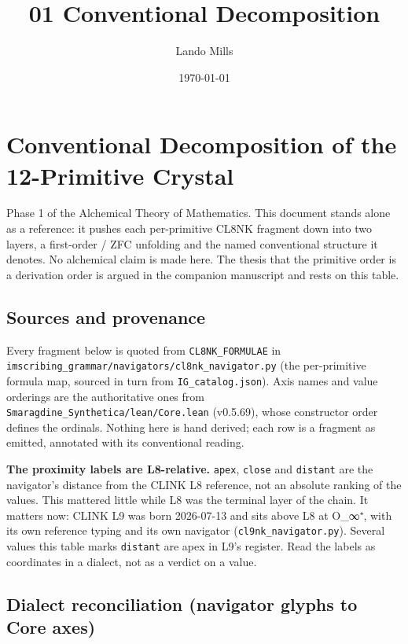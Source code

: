 \documentclass[12pt,a4paper]{article}
\title{01 Conventional Decomposition}
\date{\today}
\author{Lando Mills}
\begin{document}
\maketitle
\hypertarget{conventional-decomposition-of-the-12-primitive-crystal}{%
\section{Conventional Decomposition of the 12-Primitive
Crystal}\label{conventional-decomposition-of-the-12-primitive-crystal}}

Phase 1 of the Alchemical Theory of Mathematics. This document stands
alone as a reference: it pushes each per-primitive CL8NK fragment down
into two layers, a first-order / ZFC unfolding and the named
conventional structure it denotes. No alchemical claim is made here. The
thesis that the primitive order is a derivation order is argued in the
companion manuscript and rests on this table.

\hypertarget{sources-and-provenance}{%
\subsection{Sources and provenance}\label{sources-and-provenance}}

Every fragment below is quoted from \texttt{CL8NK\_FORMULAE} in
\texttt{imscribing\_grammar/navigators/cl8nk\_navigator.py} (the
per-primitive formula map, sourced in turn from
\texttt{IG\_catalog.json}). Axis names and value orderings are the
authoritative ones from \texttt{Smaragdine\_Synthetica/lean/Core.lean}
(v0.5.69), whose constructor order defines the ordinals. Nothing here is
hand derived; each row is a fragment as emitted, annotated with its
conventional reading.

\textbf{The proximity labels are L8-relative.} \texttt{apex},
\texttt{close} and \texttt{distant} are the navigator's distance from
the CLINK L8 reference, not an absolute ranking of the values. This
mattered little while L8 was the terminal layer of the chain. It matters
now: CLINK L9 was born 2026-07-13 and sits above L8 at O\_∞⁺, with its
own reference typing and its own navigator
(\texttt{cl9nk\_navigator.py}). Several values this table marks
\texttt{distant} are apex in L9's register. Read the labels as
coordinates in a dialect, not as a verdict on a value.

\hypertarget{dialect-reconciliation-navigator-glyphs-to-core-axes}{%
\subsection{Dialect reconciliation (navigator glyphs to Core
axes)}\label{dialect-reconciliation-navigator-glyphs-to-core-axes}}
\end{document}
